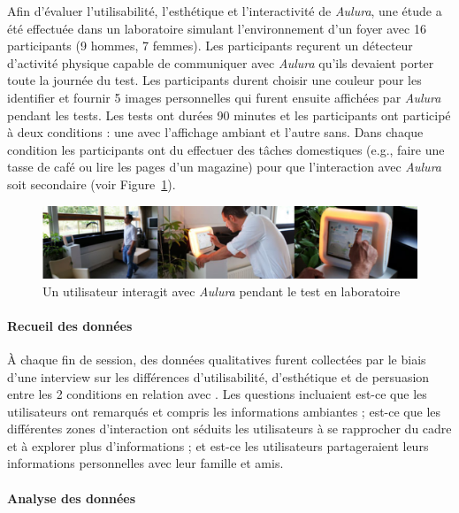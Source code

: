\documentclass[10pt,a5paper,twoside]{article}
\begin{document}
Afin d'évaluer l'utilisabilité, l'esthétique et l'interactivité de
\emph{Aulura}, une étude a été effectuée dans un laboratoire simulant
l'environnement d'un foyer avec 16 participants (9 hommes, 7 femmes).
Les participants reçurent un détecteur d'activité physique capable de
communiquer avec \emph{Aulura} qu'ils devaient porter toute la journée
du test. Les participants durent choisir une couleur pour les identifier
et fournir 5 images personnelles qui furent ensuite affichées par
\emph{Aulura} pendant les tests. Les tests ont durées 90 minutes et les
participants ont participé à deux conditions : une avec l'affichage
ambiant et l'autre sans. Dans chaque condition les participants ont du
effectuer des tâches domestiques (e.g., faire une tasse de café ou lire
les pages d'un magazine) pour que l'interaction avec \emph{Aulura} soit
secondaire (voir Figure~\ref{fig:aulura3}).

\begin{figure}
\centering
\includegraphics[width=0.900\hsize]{images/Aulura-screenshot1.png}
\caption{Un utilisateur interagit avec \emph{Aulura} pendant le test en
laboratoire}\label{fig:aulura3}
\end{figure}

\paragraph{Recueil des données}\label{recueil-des-donnuxe9es-2}

À chaque fin de session, des données qualitatives furent collectées par
le biais d'une interview sur les différences d'utilisabilité,
d'esthétique et de persuasion entre les 2 conditions en relation avec .
Les questions incluaient est-ce que les utilisateurs ont remarqués et
compris les informations ambiantes ; est-ce que les différentes zones
d'interaction ont séduits les utilisateurs à se rapprocher du cadre et à
explorer plus d'informations ; et est-ce les utilisateurs partageraient
leurs informations personnelles avec leur famille et amis.

\paragraph{Analyse des données}\label{analyse-des-donnuxe9es-1}
\end{document}

